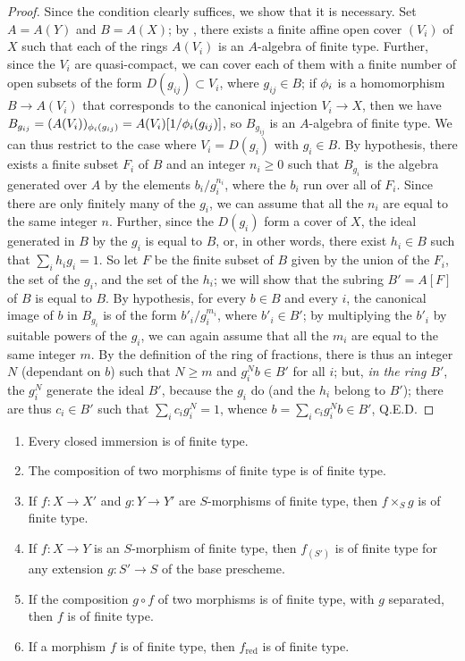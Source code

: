 \begin{proof}
\label{proof-1.6.3.3}
Since the condition clearly suffices, we show that it is necessary.
Set $A=A(Y)$ and $B=A(X)$;
by , there exists a finite affine open cover $(V_i)$ of $X$ such that each of the rings $A(V_i)$ is an $A$-algebra of finite type.
Further, since the $V_i$ are quasi-compact, we can cover each of them with a finite number of open subsets of the form $D(g_{ij})\subset V_i$, where $g_{ij}\in B$;
if $\phi_i$ is a homomorphism $B\to A(V_i)$ that corresponds to the canonical injection $V_i\to X$, then we have $B_{g_{ij}}=(A(V_i))_{\phi_i(g_{ij})}=A(V_i)[1/\phi_i(g_{ij})]$, so $B_{g_{ij}}$ is an $A$-algebra of finite type.
We can thus restrict to the case where $V_i=D(g_i)$ with $g_i\in B$.
By hypothesis, there exists a finite subset $F_i$ of $B$ and an integer $n_i\geqslant0$ such that $B_{g_i}$ is the algebra generated over $A$ by the elements $b_i/g_i^{n_i}$, where the $b_i$ run over all of $F_i$.
Since there are only finitely many of the $g_i$, we can assume that all the $n_i$ are equal to the same integer $n$.
Further, since the $D(g_i)$ form a cover of $X$, the ideal generated in $B$ by the $g_i$ is equal to $B$, or, in other words, there exist $h_i\in B$ such that $\sum_i h_ig_i=1$.
So let $F$ be the finite subset of $B$ given by the union of the $F_i$, the set of the $g_i$, and the set of the $h_i$; we will show that the subring $B'=A[F]$ of $B$ is equal to $B$.
By hypothesis, for every $b\in B$ and every $i$, the canonical image of $b$ in $B_{g_i}$ is of the form $b'_i/g_i^{m_i}$, where $b'_i\in B'$;
by multiplying the $b'_i$ by suitable powers of the $g_i$, we can again assume that all the $m_i$ are equal to the same integer $m$.
By the definition of the ring of fractions, there is thus an integer $N$ (dependant on $b$) such that $N\geqslant m$ and $g_i^Nb\in B'$ for all $i$;
but, \emph{in the ring $B'$}, the $g_i^N$ generate the ideal $B'$, because the $g_i$ do (and the $h_i$ belong to $B'$);
there are thus $c_i\in B'$ such that $\sum_i c_ig_i^N=1$, whence $b=\sum_ic_ig_i^Nb\in B'$, Q.E.D.
\end{proof}

\begin{prop}[6.3.4]
\label{1.6.3.4}
\begin{enumerate}[label=\rm(\roman*)]
    \item Every closed immersion is of finite type.
    \item The composition of two morphisms of finite type is of finite type.
    \item If $f\colon X\to X'$ and $g\colon Y\to Y'$ are $S$-morphisms of finite type, then $f\times_S g$ is of finite type.
    \item If $f\colon X\to Y$ is an $S$-morphism of finite type, then $f_{(S')}$ is of finite type for any extension $g\colon S'\to S$ of the base prescheme.
    \item If the composition $g\circ f$ of two morphisms is of finite type, with $g$ separated, then $f$ is of finite type.
    \item If a morphism $f$ is of finite type, then $f_\mathrm{red}$ is of finite type.
\end{enumerate}
\end{prop}

